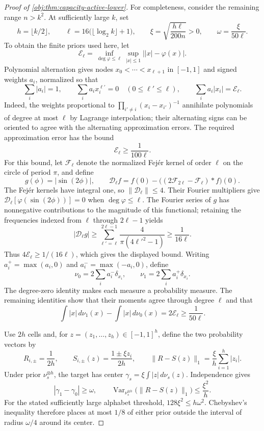 \begin{proof}[Proof of \cref{obj:thm:capacity-active-lower}]
For completeness, consider the remaining range \(n>k^2\). At sufficiently large \(k\), set
\[
h=\lfloor k/2\rfloor,\qquad
\ell=16\bigl(\lfloor\log_2 k\rfloor+1\bigr),\qquad
\xi=\sqrt{\frac{h\ell}{200n}}>0,\qquad
\omega=\frac{\xi}{50\ell}.
\] %
To obtain the finite priors used here, let
\[
\mathcal E_\ell=\inf_{\deg\varphi\le\ell}\sup_{|x|\le1}\bigl||x|-\varphi(x)\bigr|.
\]
Polynomial alternation gives nodes \(x_0<\cdots<x_{\ell+1}\) in \([-1,1]\) and signed weights \(a_i\), normalized so that
\[
\sum_i|a_i|=1,\qquad
\sum_i a_i x_i^{\ell'}=0\quad(0\le\ell'\le\ell),\qquad
\sum_i a_i|x_i|=\mathcal E_\ell.
\]
Indeed, the weights proportional to \(\prod_{i'\ne i}(x_i-x_{i'})^{-1}\) annihilate polynomials of degree at most \(\ell\) by Lagrange interpolation; their alternating signs can be oriented to agree with the alternating approximation errors. The required approximation error has the bound
\[
\mathcal E_\ell\ge\frac1{100\ell}.
\]
For this bound, let \(\mathscr F_\ell\) denote the normalized Fejér kernel of order \(\ell\) on the circle of period \(\pi\), and define
\[
g(\phi)=|\sin(2\phi)|,\qquad
\mathscr D_\ell f=f(0)-\bigl((2\mathscr F_{2\ell}-\mathscr F_\ell)*f\bigr)(0).
\]
The Fejér kernels have integral one, so \(\|\mathscr D_\ell\|\le4\). Their Fourier multipliers give \(\mathscr D_\ell[\varphi(\sin(2\phi))]=0\) when \(\deg\varphi\le\ell\). The Fourier series of \(g\) has nonnegative contributions to the magnitude of this functional; retaining the frequencies indexed from \(\ell\) through \(2\ell-1\) yields
\[
|\mathscr D_\ell g|
\ge\sum_{\ell'=\ell}^{2\ell-1}
 \frac{4}{\pi(4{\ell'}^2-1)}
\ge\frac1{16\ell}.
\]
Thus \(4\mathcal E_\ell\ge1/(16\ell)\), which gives the displayed bound. Writing \(a_i^+=\max(a_i,0)\) and \(a_i^-=\max(-a_i,0)\), define
\[
\nu_0=2\sum_i a_i^-\delta_{x_i},\qquad
\nu_1=2\sum_i a_i^+\delta_{x_i}.
\]
The degree-zero identity makes each measure a probability measure. The remaining identities show that their moments agree through degree \(\ell\) and that
\[
\int|x|\,d\nu_1(x)-\int|x|\,d\nu_0(x)
=2\mathcal E_\ell\ge\frac1{50\ell}.
\] %

Use \(2h\) cells and, for \(z=(z_1,\ldots,z_h)\in[-1,1]^h\), define the two probability vectors by
\[
R_{i,\pm}=\frac1{2h},\qquad
S_{i,\pm}(z)=\frac{1\pm\xi z_i}{2h},
\qquad
\|R-S(z)\|_1=\frac{\xi}{h}\sum_{i=1}^h|z_i|.
\] %
Under prior \(\nu_s^{\otimes h}\), the target has center
\(\gamma_s=\xi\int|z|\,d\nu_s(z)\). Independence gives
\[
|\gamma_1-\gamma_0|\ge\omega,\qquad
\operatorname{Var}_{\nu_s^{\otimes h}}\!\bigl(\|R-S(z)\|_1\bigr)
\le\frac{\xi^2}{h}.
\] %
For the stated sufficiently large alphabet threshold, \(128\xi^2\le h\omega^2\). Chebyshev’s inequality therefore places at most \(1/8\) of either prior outside the interval of radius \(\omega/4\) around its center. %


\end{proof}
